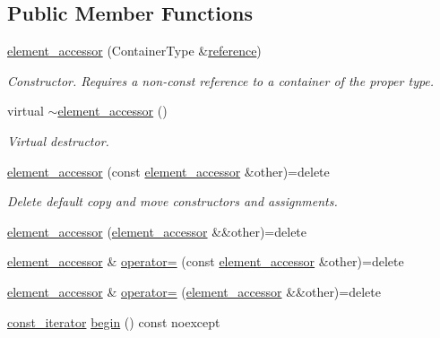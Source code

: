 \subsection*{Public Member Functions}
\begin{DoxyCompactItemize}
\item 
\hyperlink{classIceBRG_1_1element__accessor_aef4b30778521e1039780961e06c22491}{element\+\_\+accessor} (Container\+Type \&\hyperlink{classIceBRG_1_1element__accessor_ae31e9fe4b35d76ed6055052fb788de13}{reference})
\begin{DoxyCompactList}\small\item\em Constructor. Requires a non-\/const reference to a container of the proper type. \end{DoxyCompactList}\item 
virtual \hyperlink{classIceBRG_1_1element__accessor_acf809c62734281f7329aa4631cc87421}{$\sim$element\+\_\+accessor} ()
\begin{DoxyCompactList}\small\item\em Virtual destructor. \end{DoxyCompactList}\item 
\hyperlink{classIceBRG_1_1element__accessor_af0a32cf064352559df47dfa7b56a70a8}{element\+\_\+accessor} (const \hyperlink{classIceBRG_1_1element__accessor}{element\+\_\+accessor} \&other)=delete
\begin{DoxyCompactList}\small\item\em Delete default copy and move constructors and assignments. \end{DoxyCompactList}\item 
\hyperlink{classIceBRG_1_1element__accessor_a24e24c2c4b7b75f61dda38a70ee1ff12}{element\+\_\+accessor} (\hyperlink{classIceBRG_1_1element__accessor}{element\+\_\+accessor} \&\&other)=delete
\item 
\hyperlink{classIceBRG_1_1element__accessor}{element\+\_\+accessor} \& \hyperlink{classIceBRG_1_1element__accessor_aee519f816c6811d7e4b5f0dfa262c7f3}{operator=} (const \hyperlink{classIceBRG_1_1element__accessor}{element\+\_\+accessor} \&other)=delete
\item 
\hyperlink{classIceBRG_1_1element__accessor}{element\+\_\+accessor} \& \hyperlink{classIceBRG_1_1element__accessor_ac9a71ff5dec73f2008259e2b96714369}{operator=} (\hyperlink{classIceBRG_1_1element__accessor}{element\+\_\+accessor} \&\&other)=delete
\item 
\hyperlink{classIceBRG_1_1element__accessor_ab9a6ca4866a0758171a4ffa7b0935cd2}{const\+\_\+iterator} \hyperlink{classIceBRG_1_1element__accessor_a11d89804615361e5bbd639a23fa04d46}{begin} () const  noexcept

\end{DoxyCompactItemize}
